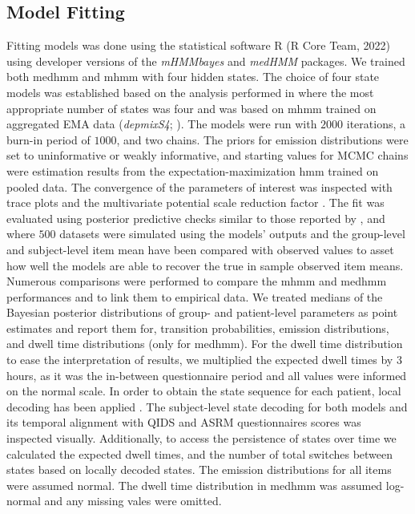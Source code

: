 \subsection{Model Fitting}
Fitting models was done using the statistical software R (R Core Team, 2022) using developer versions of the \emph{mHMMbayes} and \emph{medHMM} packages. We trained both \ac{medhmm} and \ac{mhmm} with four hidden states. The choice of four state models was established based on the analysis performed in \cite{mildiner_moraga_bos_doornbos_bruggeman_van_2023} where the most appropriate number of states was four and was based on \ac{mhmm} trained on aggregated EMA data (\emph{depmixS4}; \citealp{Visser_Speekenbrink_2010}). The models were run with $2000$ iterations, a burn-in period of $1000$, and two chains. The priors for emission distributions were set to uninformative or weakly informative, and starting values for MCMC chains were estimation results from the expectation-maximization \ac{hmm} trained on pooled data. The convergence of the parameters of interest was inspected with trace plots and the multivariate potential scale reduction factor \citep{Brooks_Gelman_1998}. The fit was evaluated using posterior predictive checks similar to those reported by \cite{mildiner_moraga_bos_doornbos_bruggeman_van_2023}, and \cite{Schliehe_Diecks_Kappeler_Langrock_2012} where $500$ datasets were simulated using the models' outputs and the group-level and subject-level item mean have been compared with observed values to asset how well the models are able to recover the true in sample observed item means. Numerous comparisons were performed to compare the \ac{mhmm} and \ac{medhmm} performances and to link them to empirical data. We treated medians of the Bayesian posterior distributions of group- and patient-level parameters as point estimates and report them for, transition probabilities, emission distributions, and dwell time distributions (only for \ac{medhmm}). For the dwell time distribution to ease the interpretation of results, we multiplied the expected dwell times by 3 hours, as it was the in-between questionnaire period and all values were informed on the normal scale. In order to obtain the state sequence for each patient, local decoding has been applied \citep{Bishop_2013, Zucchini_MacDonald_2009}. The subject-level state decoding for both models and its temporal alignment with QIDS and ASRM questionnaires scores was inspected visually. Additionally, to access the persistence of states over time we calculated the expected dwell times, and the number of total switches between states based on locally decoded states. The emission distributions for all items were assumed normal. The dwell time distribution in \ac{medhmm} was assumed log-normal and any missing vales were omitted.
